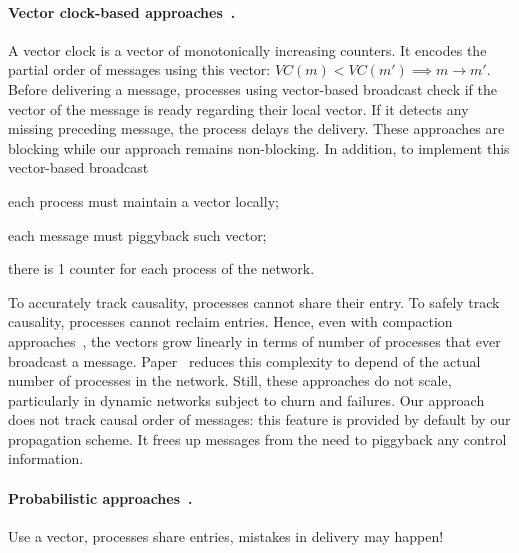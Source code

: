 \paragraph{Vector clock-based
  approaches~\cite{fidge1988timestamps,mattern1989virtual}.} A vector clock is a
vector of monotonically increasing counters.  It encodes the partial order of
messages using this vector: $VC(m) < VC(m') \implies m \rightarrow m'$.  Before
delivering a message, processes using vector-based broadcast check if the vector
of the message is ready regarding their local vector. If it detects any missing
preceding message, the process delays the delivery. These approaches are
blocking while our approach remains non-blocking.  In addition, to implement
this vector-based broadcast
\begin{inparaenum}[(i)]
\item each process must maintain a vector locally;
\item each message must piggyback such vector;
\item there is 1 counter for each process of the network.
\end{inparaenum}
To accurately track causality, processes cannot share their entry. To safely
track causality, processes cannot reclaim entries. Hence, even with compaction
approaches~\cite{singhal1992efficient}, the vectors grow linearly in terms of
number of processes that ever broadcast a
message. Paper~\cite{almeida2008interval} reduces this complexity to depend of
the actual number of processes in the network. Still,
these approaches do not scale, particularly in dynamic networks subject to churn
and failures. Our approach does not track causal order of messages: this feature
is provided by default by our propagation scheme. It frees up messages from the
need to piggyback any control information.



\paragraph{Probabilistic approaches~\cite{mostefaoui2017probabilistic}.} Use a
vector, processes share entries, mistakes in delivery may happen! 


